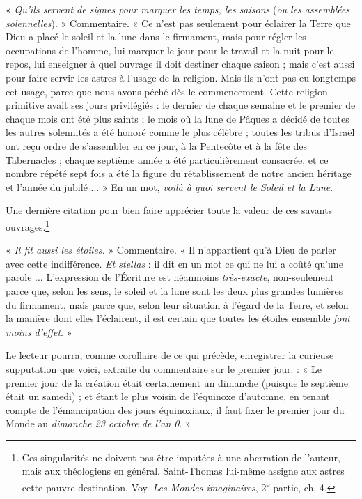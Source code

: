 \documentclass[a4paper, 11pt, oneside]{article}
\begin{document}
« \emph{Qu'ils servent de signes pour marquer les temps, les saisons} (\emph{ou les assemblées solennelles}). » Commentaire. « Ce n'est pas seulement pour éclairer la Terre que Dieu a placé le soleil et la lune dans le firmament, mais pour régler les occupations de l'homme, lui marquer le jour pour le travail et la nuit pour le repos, lui enseigner à quel ouvrage il doit destiner chaque saison ; mais c'est aussi pour faire servir les astres à l'usage de la religion. Mais ils n'ont pas eu longtemps cet usage, parce que nous avons péché dès le commencement. Cette religion primitive avait ses jours privilégiés : le dernier de chaque semaine et le premier de chaque mois ont été plus saints ; le mois où la lune de Pâques a décidé de toutes les autres solennités a été honoré comme le plus célèbre ; toutes les tribus d'Israël ont reçu ordre de s'assembler en ce jour, à la Pentecôte et à la fête des Tabernacles ; chaque septième année a été particulièrement consacrée, et ce nombre répété sept fois a été la figure du rétablissement de notre ancien héritage et l'année du jubilé ... » En un mot, \emph{voilà à quoi servent le Soleil et la Lune}.

Une dernière citation pour bien faire apprécier toute la valeur de ces savants ouvrages.\footnote{Ces singularités ne doivent pas être imputées à une aberration de l'auteur, mais aux théologiens en général. Saint-Thomas lui-même assigne aux astres cette pauvre destination. Voy. \emph{Les Mondes imaginaires}, 2\textsuperscript{e} partie, ch. 4.}

« \emph{Il fit aussi les étoiles.} » Commentaire. « Il n'appartient qu'à Dieu de parler avec cette indifférence. \emph{Et stellas} : il dit en un mot ce qui ne lui a coûté qu'une parole ... L'expression de l'Écriture est néanmoins \emph{très-exacte}, non-seulement parce que, selon les sens, le soleil et la lune sont les deux plus grandes lumières du firmament, mais parce que, selon leur situation à l'égard de la Terre, et selon la manière dont elles l'éclairent, il est certain que toutes les étoiles ensemble \emph{font moins d'effet}. »

Le lecteur pourra, comme corollaire de ce qui précède, enregistrer la curieuse supputation que voici, extraite du commentaire sur le premier jour. : « Le premier jour de la création était certainement un dimanche (puisque le septième était un samedi) ; et étant le plus voisin de l'équinoxe d'automne, en tenant compte de l'émancipation des jours équinoxiaux, il faut fixer le premier jour du Monde au \emph{dimanche 23 octobre de l'an 0}. »
\end{document}
